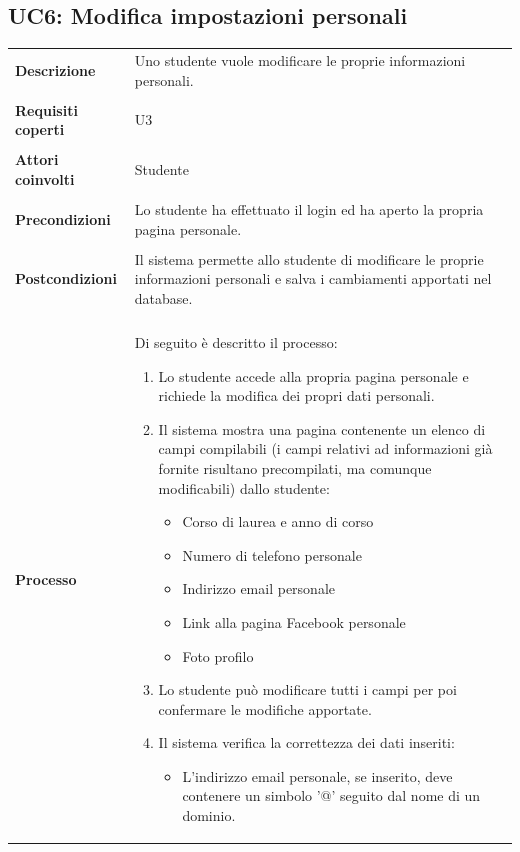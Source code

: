 \documentclass[10pt,a4paper]{report}
\begin{document}
	\subsection{UC6: Modifica impostazioni personali}
	\begin{tabular}{lp{}}
		\textbf{Descrizione}&Uno studente vuole modificare le proprie informazioni personali.\\
		\\
		\textbf{Requisiti coperti}&U3\\
		\\
		\textbf{Attori coinvolti}&Studente\\
		\\
		\textbf{Precondizioni}&Lo studente ha effettuato il login ed ha aperto la propria pagina personale.\\
		\\
		\textbf{Postcondizioni}&Il sistema permette allo studente di modificare le proprie informazioni personali e salva i cambiamenti apportati nel database.\\
		\\
		\textbf{Processo}&Di seguito è descritto il processo:
		\begin{enumerate}
			\item Lo studente accede alla propria pagina personale e richiede la modifica dei propri dati personali.
			\item Il sistema mostra una pagina contenente un elenco di campi compilabili (i campi relativi ad informazioni già fornite risultano precompilati, ma comunque modificabili) dallo studente:
			\begin{itemize}
				\item Corso di laurea e anno di corso
				\item Numero di telefono personale
				\item Indirizzo email personale
				\item Link alla pagina Facebook personale
				\item Foto profilo
			\end{itemize}
			\item Lo studente può modificare tutti i campi per poi confermare le modifiche apportate.
			\item Il sistema verifica la correttezza dei dati inseriti:
			\begin{itemize}
				\item L'indirizzo email personale, se inserito, deve contenere un simbolo '@' seguito dal nome di un dominio.
			\end{itemize}

\end{enumerate}
\end{tabular}
\end{document}
